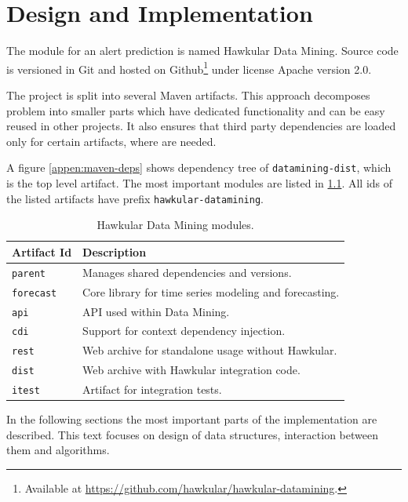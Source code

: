 \chapter{Design and Implementation} \label{chap:design-im[pl}
The module for an alert prediction is named Hawkular Data Mining. Source code is versioned in Git and
hosted on Github\footnote{Available at \url{https://github.com/hawkular/hawkular-datamining}.} under
license Apache version 2.0.

The project is split into several Maven artifacts. This approach decomposes problem into smaller parts
which have dedicated functionality and can be easy reused in other projects. It also ensures that
third party dependencies are loaded only for certain artifacts, where are needed.

A figure \ref{appen:maven-deps} shows dependency tree of \texttt{datamining-dist}, which is the top level artifact.
The most important modules are listed in \ref{tab:datamining-modules}. All ids of the listed artifacts have prefix
\texttt{hawkular-datamining}.

\begin{table}[h]
    \begin{center}
        \begin{tabular}{l|l}
            \textbf{Artifact Id} & \textbf{Description} \\ \hline \hline
            \texttt{parent} & Manages shared dependencies and versions. \\
            \texttt{forecast} & Core library for time series modeling and forecasting. \\
            \texttt{api} & API used within Data Mining. \\
            \texttt{cdi} & Support for context dependency injection. \\
            \texttt{rest} & Web archive for standalone usage without Hawkular. \\
            \texttt{dist} & Web archive with Hawkular integration code. \\
            \texttt{itest} & Artifact for integration tests.
        \end{tabular}
        \caption{Hawkular Data Mining modules.}
        \label{tab:datamining-modules}
    \end{center}
\end{table}

In the following sections the most important parts of the implementation are described. This text focuses on
design of data structures, interaction between them and algorithms.

